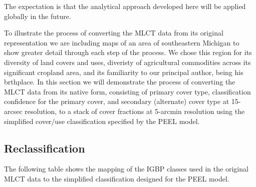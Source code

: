The expectation is that the analytical approach developed here will be
applied globally in the future.

To illustrate the process of converting the MLCT data from its
original representation we are including maps of an area of
southeastern Michigan to show greater detail through each step of the
process.  We chose this region for its diversity of land covers and
uses, diveristy of agricultural commodities across its significant
cropland area, and its familiarity to our principal author, being his
brthplace.  In this section we will demonstrate the process of
converting the MLCT data from its native form, consisting of primary
cover type, classification confidence for the primary cover, and
secondary (alternate) cover type at 15-arcsec resolution, to a stack
of cover fractions at 5-arcmin resolution using the simplified
cover/use classification specified by the PEEL model. 

\subsection{Reclassification}
\label{sec:mlct-reclass}

The following table shows the mapping of the IGBP classes used in the
original MLCT data to the simplified classification designed for the
PEEL model.



